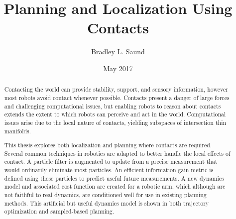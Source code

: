 \documentclass[hidelinks, 12pt]{cmuthesis}
\begin{document}
 
\frontmatter

\pagestyle{empty}

\title{ %
{\bf Planning and Localization Using Contacts}}
\author{Bradley L. Saund}
\date{May 2017}
\trnumber{}


\support{}
\disclaimer{}



\maketitle



\pagestyle{plain} %


\begin{abstract}
  Contacting the world can provide stability, support, and sensory information, however most robots avoid contact whenever possible.
  Contacts present a danger of large forces and challenging computational issues, but enabling robots to reason about contacts extends the extent to which robots can perceive and act in the world.
  Computational issues arise due to the local nature of contacts, yielding subspaces of intersection thin manifolds.

  This thesis explores both localization and planning where contacts are required.
  Several common techniques in robotics are adapted to better handle the local effects of contact.
  A particle filter is augmented to update from a precise measurement that would ordinarily eliminate most particles.
  An efficient information gain metric is defined using these particles to predict useful future measurements.
  A new dynamics model and associated cost function are created for a robotic arm, which although are not faithful to real dynamics, are conditioned well for use in existing planning methods.
  This artificial but useful dynamics model is shown in both trajectory optimization and sampled-based planning.
  
\end{abstract}
\end{document}
